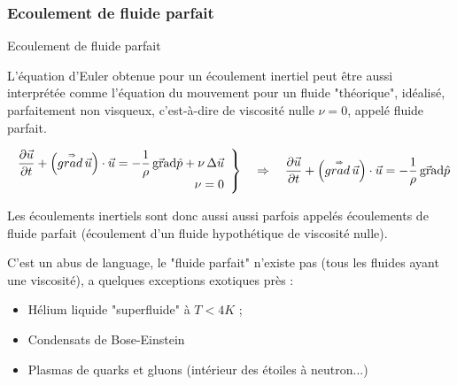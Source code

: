 \subsubsection{Ecoulement de fluide parfait}
\begin{frame}{Ecoulement de fluide parfait}

\small

L'équation d'Euler obtenue pour un écoulement inertiel peut être aussi interprétée comme 
l'équation du mouvement pour un fluide "théorique", idéalisé, parfaitement non visqueux, 
c'est-à-dire de viscosité nulle $\nu=0$, appelé \textcolor{vert}{fluide parfait}.

\begin{minipage}{90mm}
\[
	\left .
	\begin{array}{r}
	\displaystyle \frac{\partial \vec{u}}{\partial t} + \left( \accentset{\Rightarrow}{grad} \, \vec{u} \right) \cdot \vec{u}
  =
  - \frac{1}{\rho} \, \vec{\mbox{\rm gra}}\mbox{\rm d} \hat{p} 
  + \nu \, \Delta \vec{u}
  \\
  \nu = 0
  \end{array}
  \right \} 
  \quad \Rightarrow \quad 
	\displaystyle \frac{\partial \vec{u}}{\partial t} + \left( \accentset{\Rightarrow}{grad} \, \vec{u} \right) \cdot \vec{u}
  =
  - \frac{1}{\rho} \, \vec{\mbox{\rm gra}}\mbox{\rm d}{\hat{p}} 
\]
\end{minipage}

\bigskip
\pause

Les écoulements inertiels sont donc aussi aussi parfois appelés 
\textcolor{vert}{écoulements de fluide parfait} (écoulement d'un fluide hypothétique de viscosité nulle).

\medskip
\pause

C'est un abus de language, le "fluide parfait" n'existe pas (tous les fluides ayant une viscosité), 
a quelques exceptions exotiques près :

\begin{itemize}
\item Hélium liquide "superfluide" à $T<4K$ ;

\item Condensats de Bose-Einstein

\item Plasmas de quarks et gluons (intérieur des étoiles à neutron...)


\end{itemize}
\end{frame}
